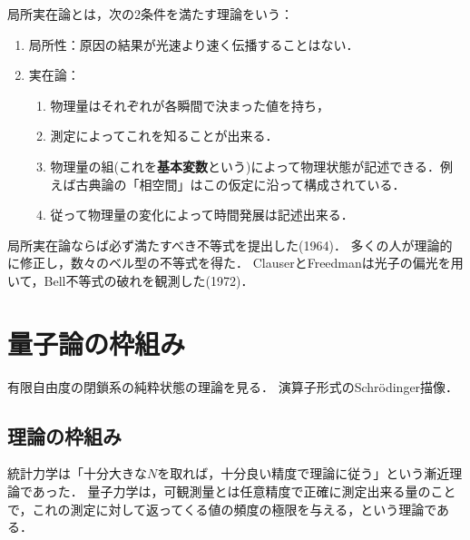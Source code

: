 \documentclass[uplatex,dvipdfmx]{jsreport}
\begin{document}
\begin{definition}
    局所実在論とは，次の2条件を満たす理論をいう：
    \begin{enumerate}
        \item 局所性：原因の結果が光速より速く伝播することはない．
        \item 実在論：
        \begin{enumerate}
            \item 物理量はそれぞれが各瞬間で決まった値を持ち，
            \item 測定によってこれを知ることが出来る．
            \item 物理量の組(これを\textbf{基本変数}という)によって物理状態が記述できる．例えば古典論の「相空間」はこの仮定に沿って構成されている．
            \item 従って物理量の変化によって時間発展は記述出来る．
        \end{enumerate}
    \end{enumerate}
\end{definition}

\begin{example}[Bellの不等式]
    局所実在論ならば必ず満たすべき不等式を提出した(1964)．
    多くの人が理論的に修正し，数々のベル型の不等式を得た．
    ClauserとFreedmanは光子の偏光を用いて，Bell不等式の破れを観測した(1972)．
\end{example}


\section{量子論の枠組み}

\begin{tcolorbox}[colframe=ForestGreen, colback=ForestGreen!10!white,breakable,colbacktitle=ForestGreen!40!white,coltitle=black,fonttitle=\bfseries\sffamily,
title=]
    有限自由度の閉鎖系の純粋状態の理論を見る．
    演算子形式のSchrödinger描像．
\end{tcolorbox}

\subsection{理論の枠組み}

\begin{tcolorbox}[colframe=ForestGreen, colback=ForestGreen!10!white,breakable,colbacktitle=ForestGreen!40!white,coltitle=black,fonttitle=\bfseries\sffamily,
title=]
    統計力学は「十分大きな$N$を取れば，十分良い精度で理論に従う」という漸近理論であった．
    量子力学は，可観測量とは任意精度で正確に測定出来る量のことで，これの測定に対して返ってくる値の頻度の極限を与える，という理論である．
\end{tcolorbox}
\end{document}
